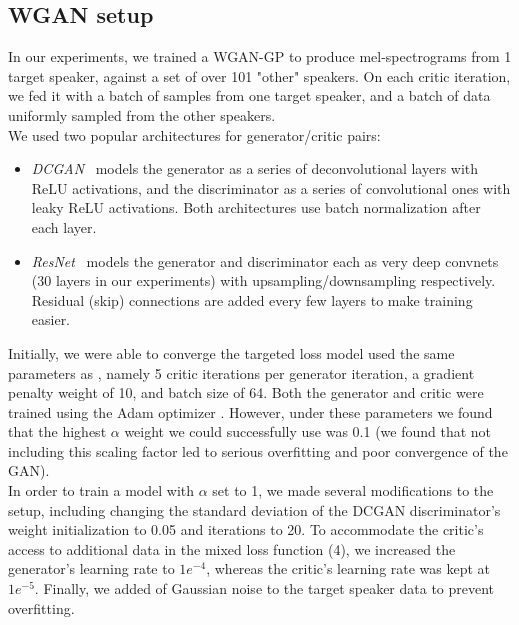 \subsection{WGAN setup}
In our experiments, we trained a WGAN-GP
to produce mel-spectrograms from 1 target speaker, against a set of over 101 "other" speakers. On each critic
iteration, we fed it with a batch of samples from one target speaker, 
and a batch of data uniformly sampled from the other speakers. \\ We used two popular
architectures for generator/critic pairs: 
\begin{itemize}
    \item \textit{DCGAN}~\cite{radford2015unsupervised} models the generator as a series of deconvolutional layers with ReLU activations, and the discriminator as a series of convolutional ones with leaky ReLU activations. Both architectures use batch normalization after each layer.
    \item \textit{ResNet}~\cite{ledig2016photo} models the generator and discriminator each as very deep convnets (30 layers in our experiments) with upsampling/downsampling respectively. Residual (skip) connections are added every few layers to make training easier.
\end{itemize}
Initially, we were able to converge the targeted loss model used the same parameters as \cite{gulrajani2017improved}, namely 5 critic iterations per generator iteration, a gradient penalty weight of 10, and batch size of 64. Both the generator and critic were trained using the Adam optimizer \cite{kingma2014adam}. However, under these parameters we found that the highest $\alpha$ weight we could successfully use was 0.1 (we found that not including this scaling factor led to serious overfitting and poor convergence of the GAN). \\ In order to train a model with $\alpha$ set to 1, we made several modifications to 
the setup, including changing the standard deviation of the DCGAN discriminator's weight initialization to 0.05 and iterations to 20. To accommodate the critic's access to additional data in the mixed loss function (4), we increased the generator's learning rate to $1e^{-4}$, whereas the critic's learning rate was kept at $1e^{-5}$. Finally, we added of Gaussian noise to the target speaker data to prevent overfitting. 


